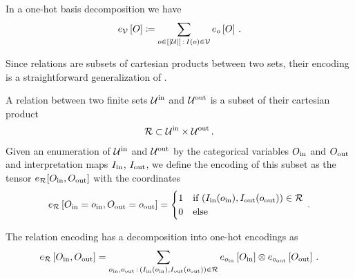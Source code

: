 In a one-hot basis decomposition we have
\begin{align*}
	e_{\mathcal{V}}\left[O\right]
	\coloneqq \sum_{o\in[\left|\mathcal{U}\right|]\,:\,I(o)\in\mathcal{V}}e_{o}\left[O\right] \, .
\end{align*}


Since relations are subsets of cartesian products between two sets, their encoding is a straightforward generalization of .

\begin{definition}
	A relation between two finite sets $\mathcal{U}^{\mathrm{in}}$ and $\mathcal{U}^{\mathrm{out}}$ is a subset of their cartesian product
	\begin{align*}
		 \mathcal{R} \subset \mathcal{U}^{\mathrm{in}} \times \mathcal{U}^{\mathrm{out}} \, .
	\end{align*}
	Given an enumeration of $\mathcal{U}^{\mathrm{in}}$ and $\mathcal{U}^{\mathrm{out}}$ by the categorical variables $O_{\mathrm{in}}$ and $O_{\mathrm{out}}$ and interpretation maps $I_{\mathrm{in}}$, $I_{\mathrm{out}}$, we define the encoding of this subset as the tensor $e_{\mathcal{R}}[O_{\mathrm{in}},O_{\mathrm{out}}]$ with the coordinates
	\begin{align*}
		e_{\mathcal{R}}\left[O_{\mathrm{in}}=o_{\mathrm{in}},O_{\mathrm{out}}=o_{\mathrm{out}}\right]
		= \begin{cases}
		1 & \text{if } (I_{\mathrm{in}}(o_{\mathrm{in}}),I_{\mathrm{out}}(o_{\mathrm{out}})) \in \mathcal{R} \\
		0 & \text{else}
		\end{cases} \, .
	\end{align*}
\end{definition}

The relation encoding has a decomposition into one-hot encodings as
\begin{align*}
	e_{\mathcal{R}}\left[O_{\mathrm{in}},O_{\mathrm{out}}\right]
	= \sum_{o_{\mathrm{in}},o_{\mathrm{out}} \, : \, (I_{\mathrm{in}}(o_{\mathrm{in}}),I_{\mathrm{out}}(o_{\mathrm{out}})) \in \mathcal{R}}
	e_{o_{\mathrm{in}}}\left[O_{\mathrm{in}}\right]  \otimes e_{o_{\mathrm{out}}}\left[O_{\mathrm{out}}\right]  \, .
\end{align*}

